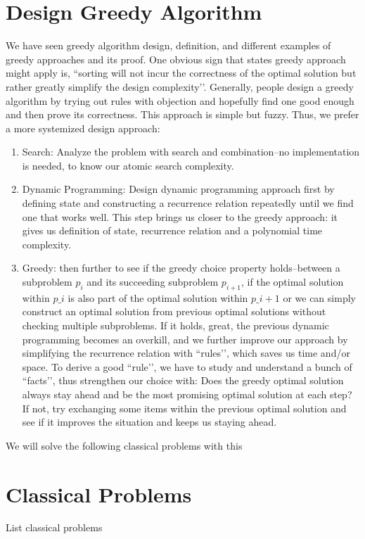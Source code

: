 \documentclass[../main.tex]{subfiles}
\begin{document}
\section{Design Greedy Algorithm}
We have seen greedy algorithm design, definition, and different examples of greedy approaches and its proof. One obvious sign that states greedy approach might apply is, ``sorting will not incur the correctness of the optimal solution but rather greatly simplify the design complexity’’. Generally, people design a greedy algorithm by trying out rules with objection and hopefully find one good enough and then prove its correctness. This approach is simple but fuzzy. Thus, we prefer a more systemized design approach:
\begin{enumerate}
    \item Search: Analyze the problem with search and combination--no implementation is needed, to know our atomic search complexity. 
\item Dynamic Programming: Design dynamic programming approach first by defining state and constructing a recurrence relation repeatedly until we find one that works well.  This step brings us closer to the greedy approach: it gives us definition of state, recurrence relation and a polynomial time complexity.
\item Greedy: then further to see if the greedy choice property holds--between a subproblem $p_i$ and its succeeding subproblem $p_{i+1}$, if the optimal solution within $p\_i$ is also part of the optimal solution within $p\_{i+1}$ or we can simply construct an optimal solution from previous optimal solutions without checking multiple subproblems. If it holds, great, the previous dynamic programming becomes an overkill, and we further improve our approach by simplifying the recurrence relation with ``rules’’, which saves us time and/or space. To derive a good ``rule’’, we have to study and understand a bunch of ``facts’’, thus strengthen our choice with: Does the greedy optimal solution always stay ahead and be the most promising optimal solution at each step? If not, try exchanging some items within the previous optimal solution and see if it improves the situation and keeps us staying ahead. 
 \end{enumerate}
We will solve the following classical problems with this

\section{Classical Problems}
List classical problems
\end{document}
